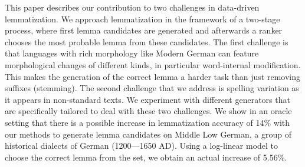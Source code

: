 This paper describes our contribution to two challenges in data-driven lemmatization. We approach lemmatization in the framework of a two-stage process, where first lemma candidates are generated and afterwards a ranker chooses the most probable lemma from these candidates. The first challenge is that languages with rich morphology like Modern German can feature morphological changes of different kinds, in particular word-internal modification. This makes the generation of the correct lemma a harder task than just removing suffixes (stemming). The second challenge that we address is spelling variation as it appears in non-standard texts. We experiment with different generators that are specifically tailored to deal with these two challenges. We show in an oracle setting that there is a possible increase in lemmatization accuracy of 14\% with our methods to generate lemma candidates on Middle Low German, a group of historical dialects of German (1200---1650 AD). Using a log-linear model to choose the correct lemma from the set, we obtain an actual increase of 5.56\%.
